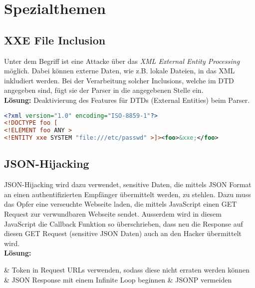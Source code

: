 \section{Spezialthemen}


\subsection{XXE File Inclusion}
Unter dem Begriff ist eine Attacke über das \textit{XML External Entity Processing} möglich. Dabei können externe Daten, wie z.B. lokale Dateien, in das XML inkludiert werden. Bei der Verarbeitung solcher Inclusions, welche im DTD angegeben sind, fügt sie der Parser in die angegebenen Stelle ein.\\

\textbf{Lösung:} Deaktivierung des Features für DTDs (External Entities) beim Parser.

\begin{lstlisting}[language=XML, caption=Beispiel der XXE]
<?xml version="1.0" encoding="ISO-8859-1"?>
<!DOCTYPE foo [  
<!ELEMENT foo ANY >
<!ENTITY xxe SYSTEM "file:///etc/passwd" >]><foo>&xxe;</foo>
\end{lstlisting}

\subsection{JSON-Hijacking}
JSON-Hijacking wird dazu verwendet, sensitive Daten, die mittels JSON Format an einen authentifizierten Empfänger übermittelt werden, zu stehlen. Dazu muss das Opfer eine verseuchte Webseite laden, die mittels JavaScript einen GET Request zur verwundbaren Webseite sendet. Ausserdem wird in diesem JavaScript die Callback Funktion so überschrieben, dass neu die Response auf diesen GET Request (sensitive JSON Daten) auch an den Hacker übermittelt wird. \\

\textbf{Lösung:}
\begin{easylist}
	& Token in Request URLs verwenden, sodass diese nicht erraten werden können
	& JSON Response mit einem Infinite Loop beginnen
	& JSONP vermeiden
\end{easylist} 

